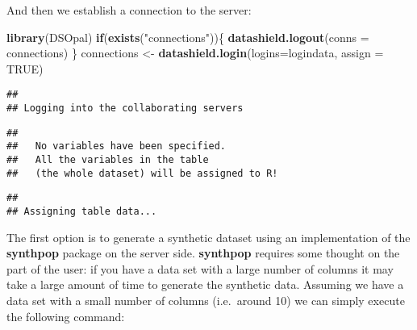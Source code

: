 \documentclass[
]{book}
\newenvironment{Shaded}{\begin{snugshade}}{\end{snugshade}}
\newcommand{\ControlFlowTok}[1]{\textcolor[rgb]{0.13,0.29,0.53}{\textbf{#1}}}
\newcommand{\DataTypeTok}[1]{\textcolor[rgb]{0.13,0.29,0.53}{#1}}
\newcommand{\DecValTok}[1]{\textcolor[rgb]{0.00,0.00,0.81}{#1}}
\newcommand{\KeywordTok}[1]{\textcolor[rgb]{0.13,0.29,0.53}{\textbf{#1}}}
\newcommand{\NormalTok}[1]{#1}
\newcommand{\OperatorTok}[1]{\textcolor[rgb]{0.81,0.36,0.00}{\textbf{#1}}}
\newcommand{\OtherTok}[1]{\textcolor[rgb]{0.56,0.35,0.01}{#1}}
\newcommand{\StringTok}[1]{\textcolor[rgb]{0.31,0.60,0.02}{#1}}
\begin{document}
And then we establish a connection to the server:

\begin{Shaded}
\begin{Highlighting}[]
\KeywordTok{library}\NormalTok{(DSOpal)}
\ControlFlowTok{if}\NormalTok{(}\KeywordTok{exists}\NormalTok{(}\StringTok{"connections"}\NormalTok{))\{}
  \KeywordTok{datashield.logout}\NormalTok{(}\DataTypeTok{conns =}\NormalTok{ connections)}
\NormalTok{\}}
\NormalTok{connections <-}\StringTok{ }\KeywordTok{datashield.login}\NormalTok{(}\DataTypeTok{logins=}\NormalTok{logindata, }\DataTypeTok{assign =} \OtherTok{TRUE}\NormalTok{)}
\end{Highlighting}
\end{Shaded}

\begin{verbatim}
## 
## Logging into the collaborating servers
\end{verbatim}

\begin{verbatim}
## 
##   No variables have been specified. 
##   All the variables in the table 
##   (the whole dataset) will be assigned to R!
\end{verbatim}

\begin{verbatim}
## 
## Assigning table data...
\end{verbatim}

The first option is to generate a synthetic dataset using an implementation of the \textbf{synthpop} package on the server side. \textbf{synthpop} requires some thought on the part of the user: if you have a data set with a large number of columns it may take a large amount of time to generate the synthetic data. Assuming we have a data set with a small number of columns (i.e.~around 10) we can simply execute the following command:

\begin{Shaded}
\end{Shaded}
\end{document}
